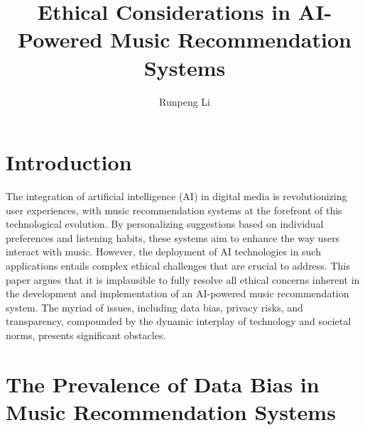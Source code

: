 \documentclass[10pt,twocolumn]{article}
\title{Ethical Considerations in AI-Powered Music Recommendation Systems}
\author{Runpeng Li}
\affiliation{Occidental College}
\begin{document}
\maketitle

\section{Introduction}

The integration of artificial intelligence (AI) in digital media is revolutionizing user experiences, with music recommendation systems at the forefront of this technological evolution. By personalizing suggestions based on individual preferences and listening habits, these systems aim to enhance the way users interact with music. However, the deployment of AI technologies in such applications entails complex ethical challenges that are crucial to address. This paper argues that it is implausible to fully resolve all ethical concerns inherent in the development and implementation of an AI-powered music recommendation system. The myriad of issues, including data bias, privacy risks, and transparency, compounded by the dynamic interplay of technology and societal norms, presents significant obstacles.



\section{The Prevalence of Data Bias in Music Recommendation Systems}
\end{document}
